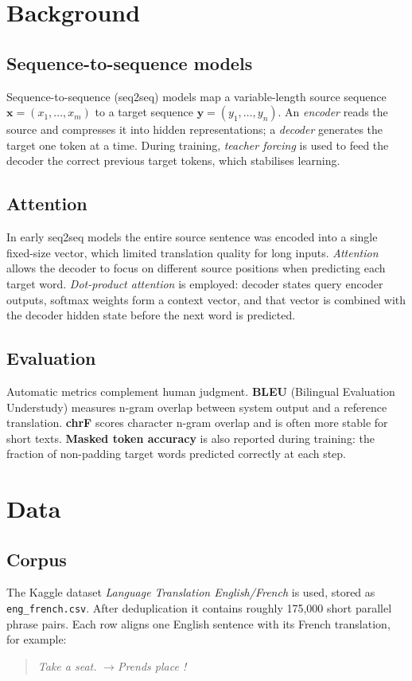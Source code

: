 \documentclass[12pt]{article}
\begin{document}
\section{Background}
\label{sec:background}

\subsection{Sequence-to-sequence models}
Sequence-to-sequence (seq2seq) models map a variable-length source sequence $\mathbf{x} = (x_1, \ldots, x_m)$ to a target sequence $\mathbf{y} = (y_1, \ldots, y_n)$. An \emph{encoder} reads the source and compresses it into hidden representations; a \emph{decoder} generates the target one token at a time. During training, \emph{teacher forcing} is used to feed the decoder the correct previous target tokens, which stabilises learning.

\subsection{Attention}
In early seq2seq models the entire source sentence was encoded into a single fixed-size vector, which limited translation quality for long inputs. \emph{Attention} allows the decoder to focus on different source positions when predicting each target word. \emph{Dot-product attention} is employed: decoder states query encoder outputs, softmax weights form a context vector, and that vector is combined with the decoder hidden state before the next word is predicted.

\subsection{Evaluation}
Automatic metrics complement human judgment. \textbf{BLEU} (Bilingual Evaluation Understudy) measures n-gram overlap between system output and a reference translation. \textbf{chrF} scores character n-gram overlap and is often more stable for short texts. \textbf{Masked token accuracy} is also reported during training: the fraction of non-padding target words predicted correctly at each step.

\section{Data}
\label{sec:data}

\subsection{Corpus}
The Kaggle dataset \emph{Language Translation English/French} \citep{kaggle_enfr} is used, stored as \texttt{eng\_french.csv}. After deduplication it contains roughly 175{,}000 short parallel phrase pairs. Each row aligns one English sentence with its French translation, for example:
\begin{quote}
  \textit{Take a seat.} \quad$\rightarrow$\quad \textit{Prends place !}
\end{quote}
\end{document}
